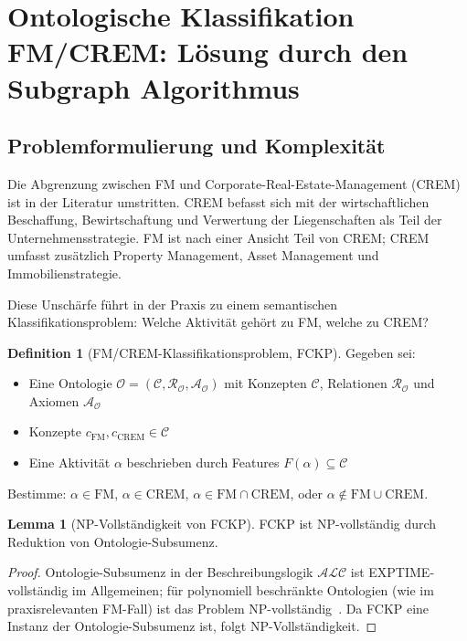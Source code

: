 ﻿\documentclass[a4paper,12pt]{article}
\theoremstyle{definition}
\newtheorem{definition}{Definition}[section]
\newtheorem{lemma}{Lemma}[section]
\begin{document}
\section{Ontologische Klassifikation FM/CREM: Lösung durch den Subgraph Algorithmus}
\label{sec:onto}

\subsection{Problemformulierung und Komplexität}

Die Abgrenzung zwischen FM und Corporate-Real-Estate-Management (CREM) ist in der
Literatur umstritten. CREM befasst sich mit der wirtschaftlichen Beschaffung,
Bewirtschaftung und Verwertung der Liegenschaften als Teil der Unternehmensstrategie.
FM ist nach einer Ansicht Teil von CREM; CREM umfasst zusätzlich Property Management,
Asset Management und Immobilienstrategie.

Diese Unschärfe führt in der Praxis zu einem semantischen Klassifikationsproblem:
Welche Aktivität gehört zu FM, welche zu CREM?

\begin{definition}[FM/CREM-Klassifikationsproblem, FCKP]
\label{def:fckp}
Gegeben sei:
\begin{itemize}
    \item Eine Ontologie $\mathcal{O} = (\mathcal{C}, \mathcal{R}_{\mathcal{O}}, \mathcal{A}_{\mathcal{O}})$
          mit Konzepten $\mathcal{C}$, Relationen $\mathcal{R}_{\mathcal{O}}$ und Axiomen $\mathcal{A}_{\mathcal{O}}$
    \item Konzepte $c_{\mathrm{FM}}, c_{\mathrm{CREM}} \in \mathcal{C}$
    \item Eine Aktivität $\alpha$ beschrieben durch Features $F(\alpha) \subseteq \mathcal{C}$
\end{itemize}
Bestimme: $\alpha \in \mathrm{FM}$, $\alpha \in \mathrm{CREM}$, $\alpha \in \mathrm{FM} \cap \mathrm{CREM}$,
oder $\alpha \notin \mathrm{FM} \cup \mathrm{CREM}$.
\end{definition}

\begin{lemma}[NP-Vollständigkeit von FCKP]
\label{lem:fckp-np}
FCKP ist NP-vollständig durch Reduktion von Ontologie-Subsumenz.
\end{lemma}

\begin{proof}
Ontologie-Subsumenz in der Beschreibungslogik $\mathcal{ALC}$ ist EXPTIME-vollständig
im Allgemeinen; für polynomiell beschränkte Ontologien (wie im praxisrelevanten FM-Fall)
ist das Problem NP-vollständig~\cite{horrocks2003}.
Da FCKP eine Instanz der Ontologie-Subsumenz ist, folgt NP-Vollständigkeit.
\end{proof}
\end{document}
